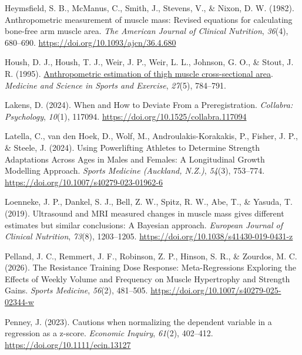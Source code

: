 \documentclass[
]{article}
\newlength{\cslhangindent}
\newenvironment{CSLReferences}[2] %
 {\begin{list}{}{%
  \setlength{\itemindent}{0pt}
  \setlength{\leftmargin}{0pt}
  \setlength{\parsep}{0pt}
  \ifodd #1
   \setlength{\leftmargin}{\cslhangindent}
   \setlength{\itemindent}{-1\cslhangindent}
  \fi
  \setlength{\itemsep}{#2\baselineskip}}}
 {\end{list}}
\begin{document}
\begin{CSLReferences}{1}{0}
Heymsfield, S. B., McManus, C., Smith, J., Stevens, V., \& Nixon, D. W.
(1982). Anthropometric measurement of muscle mass: Revised equations for
calculating bone-free arm muscle area. \emph{The American Journal of
Clinical Nutrition}, \emph{36}(4), 680--690.
\url{https://doi.org/10.1093/ajcn/36.4.680}

Housh, D. J., Housh, T. J., Weir, J. P., Weir, L. L., Johnson, G. O., \&
Stout, J. R. (1995).
\href{https://www.ncbi.nlm.nih.gov/pubmed/7674885}{Anthropometric
estimation of thigh muscle cross-sectional area}. \emph{Medicine and
Science in Sports and Exercise}, \emph{27}(5), 784--791.

Lakens, D. (2024). When and {How} to {Deviate From} a {Preregistration}.
\emph{Collabra: Psychology}, \emph{10}(1), 117094.
\url{https://doi.org/10.1525/collabra.117094}

Latella, C., van den Hoek, D., Wolf, M., Androulakis-Korakakis, P.,
Fisher, J. P., \& Steele, J. (2024). Using {Powerlifting Athletes} to
{Determine Strength Adaptations Across Ages} in {Males} and {Females}:
{A Longitudinal Growth Modelling Approach}. \emph{Sports Medicine
(Auckland, N.Z.)}, \emph{54}(3), 753--774.
\url{https://doi.org/10.1007/s40279-023-01962-6}

Loenneke, J. P., Dankel, S. J., Bell, Z. W., Spitz, R. W., Abe, T., \&
Yasuda, T. (2019). Ultrasound and {MRI} measured changes in muscle mass
gives different estimates but similar conclusions: A {Bayesian}
approach. \emph{European Journal of Clinical Nutrition}, \emph{73}(8),
1203--1205. \url{https://doi.org/10.1038/s41430-019-0431-z}

Pelland, J. C., Remmert, J. F., Robinson, Z. P., Hinson, S. R., \&
Zourdos, M. C. (2026). The {Resistance Training Dose Response}:
{Meta-Regressions Exploring} the {Effects} of {Weekly Volume} and
{Frequency} on {Muscle Hypertrophy} and {Strength Gains}. \emph{Sports
Medicine}, \emph{56}(2), 481--505.
\url{https://doi.org/10.1007/s40279-025-02344-w}

Penney, J. (2023). Cautions when normalizing the dependent variable in a
regression as a z-score. \emph{Economic Inquiry}, \emph{61}(2),
402--412. \url{https://doi.org/10.1111/ecin.13127}


\end{CSLReferences}
\end{document}
